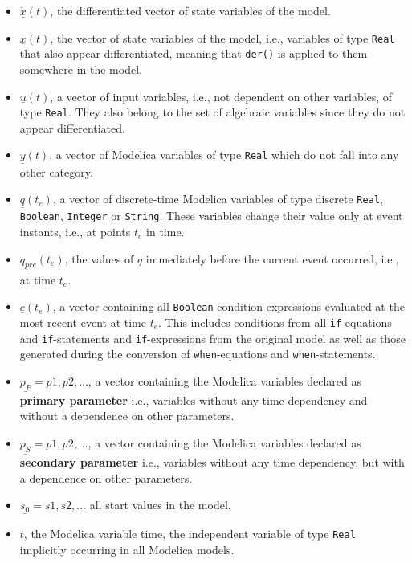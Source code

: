 \begin{itemize}
\item $\underline{\dot x}(t)$, the differentiated vector of state variables of
the model.
\item $\underline{x}(t)$, the vector of state variables of the model, i.e.,
variables of type \verb+Real+ that also appear differentiated, meaning that \verb+der()+ is
applied to them somewhere in the model.
\item $\underline{u}(t)$, a vector of input variables, i.e., not dependent on
other variables, of type \verb+Real+. They also belong to the set of algebraic
variables since they do not appear differentiated.
\item $\underline{y}(t)$, a vector of Modelica variables of type \verb+Real+
which do not fall into any other category.
\item $\underline{q}(t_e)$, a vector of discrete-time Modelica variables of type
discrete \verb+Real+, \verb+Boolean+, \verb+Integer+ or \verb+String+. These variables
change their value only at event instants, i.e., at points $t_e$ in time.
\item $\underline{q_{pre}}(t_e)$, the values of $q$ immediately before the
current event occurred, i.e., at time $t_e$.
\item $\underline{c}(t_e)$, a vector containing all \verb+Boolean+ condition
expressions evaluated at the most recent event at time $t_e$. This includes conditions from
all \verb+if+-equations and \verb+if+-statements and \verb+if+-expressions from
the original model as well as those generated during the conversion of \verb+when+-equations
and \verb+when+-statements.
\item $\underline{p_{P}} = {p1, p2, \ldots}$, a vector containing the Modelica
variables declared as \textbf{primary parameter} i.e., variables without any
time dependency and without a dependence on other parameters.
\item $\underline{p_{S}} = {p1, p2, \ldots}$, a vector containing the Modelica
variables declared as \textbf{secondary parameter} i.e., variables without any
time dependency, but with a dependence on other parameters.
\item $\underline{s_0} = {s1, s2, \ldots}$ all start values in the model.
\item $t$, the Modelica variable time, the independent variable of type
\verb+Real+ implicitly occurring in all Modelica models.
\end{itemize}

